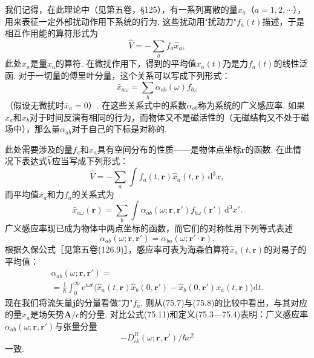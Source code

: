 我们记得，在此理论中（见第五卷，§125），有一系列离散的量$x_{a}$（$a=1,2,\cdots$），用来表征一定外部扰动作用下系统的行为. 这些扰动用"扰动力"$f_{a}(t)$描述，于是相互作用能的算符形式为
\begin{equation*}
\hat{V}=-\sum_{a}f_{a}\hat{x}_{a},
\end{equation*}
此处$\hat{x}_{a}$是量$x_{a}$的算符. 在微扰作用下，得到的平均值$\bar{x}_{a}(t)$乃是力$f_{a}(t)$的线性泛函. 对于一切量的傅里叶分量，这个关系可以写成下列形式：
\begin{equation*}
\bar{x}_{a\omega}=\sum_{b}\alpha_{ab}(\omega)f_{b\omega}
\end{equation*}
（假设无微扰时$\bar{x}_{a}=0$）. 在这些关系式中的系数$\alpha_{ab}$称为系统的广义感应率. 如果$x_{a}$和$x_{b}$对于时间反演有相同的行为，而物体又不是磁活性的（无磁结构又不处于磁场中），那么量$\alpha_{ab}$对于自己的下标是对称的.

此处需要涉及的量$f_{a}$和$x_{a}$具有空间分布的性质——是物体点坐标$\bm{r}$的函数. 在此情况下表达式$\hat{V}$应当写成下列形式：
\begin{equation}
\hat{V}=-\sum_{a}\int f_{a}(t,\bm{r})\hat{x}_{a}(t,\bm{r})\,\mathrm{d}^{3}x,
\end{equation}
而平均值$\bar{x}_{a}$和力$f_{a}$的关系式为
\begin{equation}
\bar{x}_{a\omega}(\bm{r})=\sum_{b}\int\alpha_{ab}(\omega;\bm{r},\bm{r}')f_{b\omega}(\bm{r}')\,\mathrm{d}^{3}x'.
\end{equation}
广义感应率现已成为物体中两点坐标的函数，而它们的对称性用下列等式表述
\begin{equation}
\alpha_{ab}(\omega;\bm{r},\bm{r}')=\alpha_{ba}(\omega;\bm{r}'\cdot\bm{r}).
\end{equation}
根据久保公式［见第五卷(126.9)］，感应率可表为海森伯算符$\hat{x}_{a}(t,\bm{r})$的对易子的平均值：
\begin{equation}
\begin{aligned}
\alpha_{ab}(\omega;\bm{r},\bm{r}')={}\\
{}=\frac{\mathrm{i}}{\hbar}\int_{0}^{\infty}\mathrm{e}^{\mathrm{i}\omega t}
\bigl\langle\hat{x}_{a}(t,\bm{r})\hat{x}_{b}(0,\bm{r}')-\hat{x}_{b}(0,\bm{r}')\hat{x}_{a}(t,\bm{r})\bigr\rangle\mathrm{d}t.
\end{aligned}
\end{equation}
现在我们将流矢量$\bm{j}$的分量看做"力"$f_{a}$. 则从(75.7)与(75.8)的比较中看出，与其对应的量$x_{a}$是场矢势$\bm{A}/c$的分量. 对比公式(75.11)和定义(75.3—75.4)表明：广义感应率$\alpha_{ab}(\omega;\bm{r},\bm{r}')$与张量分量
\begin{equation*}
-D_{ik}^{R}(\omega;\bm{r},\bm{r}')/\hbar c^{2}
\end{equation*}
一致.


